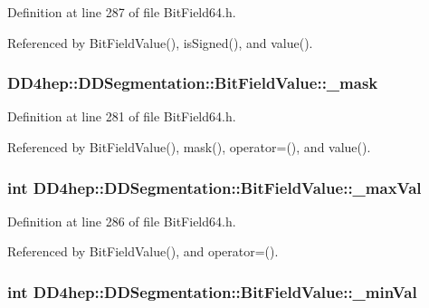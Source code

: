 Definition at line 287 of file BitField64.h.

Referenced by BitFieldValue(), isSigned(), and value().\hypertarget{class_d_d4hep_1_1_d_d_segmentation_1_1_bit_field_value_a26159ffbb10cef7fa2ed73f9db058465}{
\subsubsection[{\_\-mask}]{ {\bf DD4hep::DDSegmentation::BitFieldValue::\_\-mask}}}
\label{class_d_d4hep_1_1_d_d_segmentation_1_1_bit_field_value_a26159ffbb10cef7fa2ed73f9db058465}


Definition at line 281 of file BitField64.h.

Referenced by BitFieldValue(), mask(), operator=(), and value().\hypertarget{class_d_d4hep_1_1_d_d_segmentation_1_1_bit_field_value_acc0f6833b9cf96123403bd90f7f70823}{
\subsubsection[{\_\-maxVal}]{\setlength{\rightskip}{0pt plus 5cm}int {\bf DD4hep::DDSegmentation::BitFieldValue::\_\-maxVal}}}
\label{class_d_d4hep_1_1_d_d_segmentation_1_1_bit_field_value_acc0f6833b9cf96123403bd90f7f70823}


Definition at line 286 of file BitField64.h.

Referenced by BitFieldValue(), and operator=().\hypertarget{class_d_d4hep_1_1_d_d_segmentation_1_1_bit_field_value_a3e346b329d28bc181bde2f9475b6e1bd}{
\subsubsection[{\_\-minVal}]{\setlength{\rightskip}{0pt plus 5cm}int {\bf DD4hep::DDSegmentation::BitFieldValue::\_\-minVal}}}
\label{class_d_d4hep_1_1_d_d_segmentation_1_1_bit_field_value_a3e346b329d28bc181bde2f9475b6e1bd}


